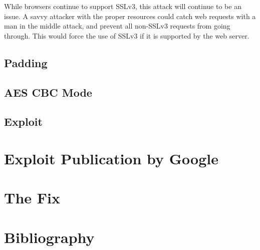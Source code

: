\documentclass[10pt]{article}
\begin{document}
While browsers continue to support SSLv3, this attack will continue to be an
issue. A savvy attacker with the proper resources could catch web requests with
a man in the middle attack, and prevent all non-SSLv3 requests from going through.
This would force the use of SSLv3 if it is supported by the web server. 

\subsection*{Padding}
\subsection*{AES CBC Mode}
\subsection*{Exploit}

\section*{Exploit Publication by Google}
\section*{The Fix}

\section*{Bibliography}


\end{document}

